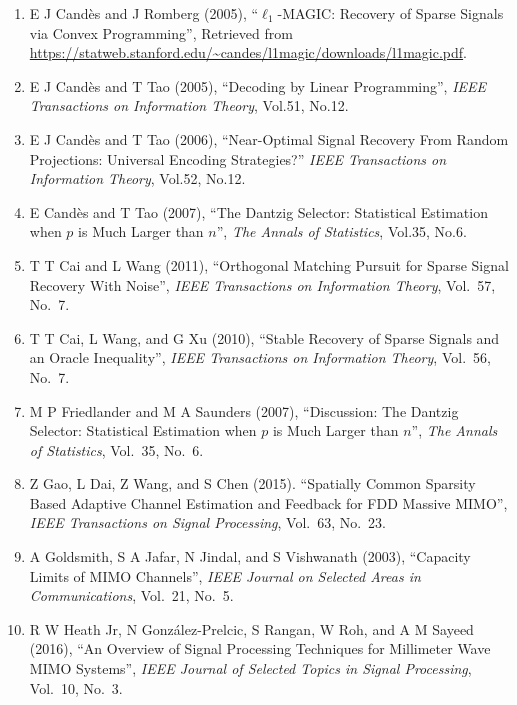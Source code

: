\documentclass[12pt]{article}
\begin{document}
\begin{enumerate}
\item E J Cand\`es and J Romberg (2005), ``\(\ell_1\)-MAGIC: Recovery of Sparse Signals via Convex Programming'', Retrieved from \url{https://statweb.stanford.edu/~candes/l1magic/downloads/l1magic.pdf}.

\item E J Cand\`es and T Tao (2005), ``Decoding by Linear Programming'', \textit{IEEE Transactions on Information Theory}, Vol.51, No.12.

\item E J Cand\`es and T Tao (2006), ``Near-Optimal Signal Recovery From Random Projections: Universal Encoding Strategies?'' \textit{IEEE Transactions on Information Theory}, Vol.52, No.12.

\item E Cand\`es and T Tao (2007), ``The Dantzig Selector: Statistical Estimation when \(p\) is Much Larger than \(n\)'', \textit{The Annals of Statistics}, Vol.35, No.6.

\item T T Cai and L Wang (2011), ``Orthogonal Matching Pursuit for Sparse Signal Recovery With Noise'', \textit{IEEE Transactions on Information Theory}, Vol.\ 57, No.\ 7.

\item T T Cai, L Wang, and G Xu (2010), ``Stable Recovery of Sparse Signals and an Oracle Inequality'', \textit{IEEE Transactions on Information Theory}, Vol.\ 56, No.\ 7.

\item M P Friedlander and M A Saunders (2007), ``Discussion: The Dantzig Selector: Statistical Estimation when \(p\) is Much Larger than \(n\)'', \textit{The Annals of Statistics}, Vol.\ 35, No.\ 6.

\item Z Gao, L Dai, Z Wang, and S Chen (2015). ``Spatially Common Sparsity Based Adaptive Channel Estimation and Feedback for FDD Massive MIMO'', \textit{IEEE Transactions on Signal Processing}, Vol.\ 63, No.\ 23.

\item A Goldsmith, S A Jafar, N Jindal, and S Vishwanath (2003), ``Capacity Limits of MIMO Channels'', \textit{IEEE Journal on Selected Areas in Communications}, Vol.\ 21, No.\ 5.

\item R W Heath Jr, N González-Prelcic, S Rangan, W Roh, and A M Sayeed (2016), ``An Overview of Signal Processing Techniques for Millimeter Wave MIMO Systems'', \textit{IEEE Journal of Selected Topics in Signal Processing}, Vol.\ 10, No.\ 3.


\end{enumerate}
\end{document}
